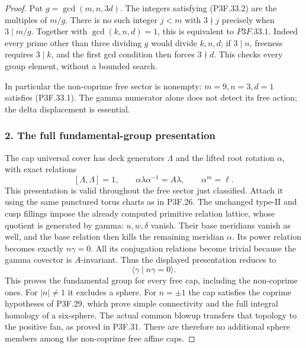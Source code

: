 \begin{proof}
Put \(g=\gcd(m,n,3d)\). The integers satisfying (P3F.33.2) are the multiples of \(m/g\). There is no such integer \(j<m\) with \(3\nmid j\) precisely when \(3\mid m/g\). Together with \(\gcd(k,n,d)=1\), this is equivalent to \(P3F.33.1\). Indeed every prime other than three dividing \(g\) would divide \(k,n,d\); if \(3\mid n\), freeness requires \(3\mid k\), and the first gcd condition then forces \(3\nmid d\). This checks every group element, without a bounded search.

In particular the non-coprime free sector is nonempty: \(m=9,n=3,d=1\) satisfies (P3F.33.1). The gamma numerator alone does not detect its free action; the delta displacement is essential.

\subsubsection{2. The full fundamental-group presentation}\label{the-full-fundamental-group-presentation}

The cap universal cover has deck generators \(\Lambda\) and the lifted root rotation \(\alpha\), with exact relations \[
 [\Lambda,\Lambda]=1,\qquad
 \alpha\lambda\alpha^{-1}=A\lambda,\qquad
 \alpha^m=\ell.
\] This presentation is valid throughout the free sector just classified. Attach it using the same punctured torus charts as in P3F.26. The unchanged type-II and cusp fillings impose the already computed primitive relation lattice, whose quotient is generated by gamma: \(u,w,\delta\) vanish. Their base meridians vanish as well, and the base relation then kills the remaining meridian \(\alpha\). Its power relation becomes exactly \(n\gamma=0\). All its conjugation relations become trivial because the gamma covector is \(A\)-invariant. Thus the displayed presentation reduces to \[
 \langle\gamma\mid n\gamma=0\rangle.
\] This proves the fundamental group for every free cap, including the non-coprime ones. For \(|n|\ne1\) it excludes a sphere. For \(n=\pm1\) the cap satisfies the coprime hypotheses of P3F.29, which prove simple connectivity and the full integral homology of a six-sphere. The actual common blowup transfers that topology to the positive fan, as proved in P3F.31. There are therefore no additional sphere members among the non-coprime free affine caps.
\end{proof}
